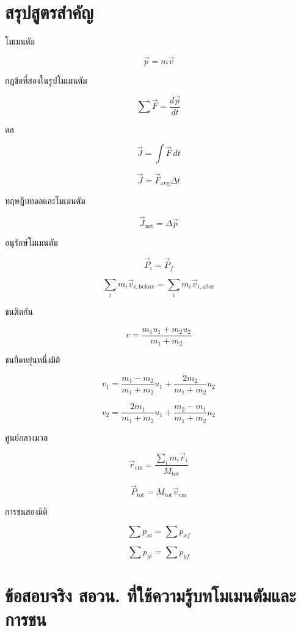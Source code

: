 \section{สรุปสูตรสำคัญ}

\begin{tcolorbox}[title=สรุปบท: โมเมนตัมเชิงเส้นและการชน]
โมเมนตัม

\[
\vec{p}=m\vec{v}
\]

กฎข้อที่สองในรูปโมเมนตัม

\[
\sum \vec{F}=\frac{d\vec{p}}{dt}
\]

ดล

\[
\vec{J}=\int \vec{F}\,dt
\]

\[
\vec{J}=\vec{F}_{\text{avg}}\Delta t
\]

ทฤษฎีบทดลและโมเมนตัม

\[
\vec{J}_{\text{net}}=\Delta \vec{p}
\]

อนุรักษ์โมเมนตัม

\[
\vec{P}_i=\vec{P}_f
\]

\[
\sum_i m_i\vec{v}_{i,\text{before}}
=
\sum_i m_i\vec{v}_{i,\text{after}}
\]
\end{tcolorbox}

\begin{tcolorbox}[title=สรุปบท: โมเมนตัมเชิงเส้นและการชน ต่อ]
ชนติดกัน

\[
v=\frac{m_1u_1+m_2u_2}{m_1+m_2}
\]

ชนยืดหยุ่นหนึ่งมิติ

\[
v_1=
\frac{m_1-m_2}{m_1+m_2}u_1
+
\frac{2m_2}{m_1+m_2}u_2
\]

\[
v_2=
\frac{2m_1}{m_1+m_2}u_1
+
\frac{m_2-m_1}{m_1+m_2}u_2
\]

ศูนย์กลางมวล

\[
\vec{r}_{\text{cm}}=\frac{\sum_i m_i\vec{r}_i}{M_{\text{tot}}}
\]

\[
\vec{P}_{\text{tot}}=M_{\text{tot}}\vec{v}_{\text{cm}}
\]

การชนสองมิติ

\[
\sum p_{xi}=\sum p_{xf}
\]

\[
\sum p_{yi}=\sum p_{yf}
\]
\end{tcolorbox}

\section{ข้อสอบจริง สอวน. ที่ใช้ความรู้บทโมเมนตัมและการชน}


